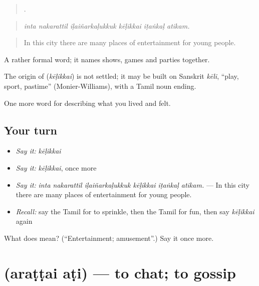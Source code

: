 \begin{quote}
     .
\end{quote}

\begin{quote}
\emph{inta nakarattil iḷaiñarkaḷukkuk kēḷikkai iṭaṅkaḷ atikam.}
\end{quote}

\begin{quote}
In this city there are many places of entertainment for young people.
\end{quote}

A rather formal word; it names shows, games and parties together.

\begin{cousinweb}
The origin of \textbf{} (\emph{kēḷikkai}) is not settled; it may be built on Sanskrit \emph{kēli}, \textquotedblleft{}play, sport, pastime\textquotedblright{} (Monier-Williams), with a Tamil noun ending.
\end{cousinweb}

\begin{grammarlens}[title={What you've built}]
One more word for describing what you lived and felt.
\end{grammarlens}

\subsection*{Your turn}
\begin{itemize}
\raggedright
  \item \emph{Say it:} \emph{kēḷikkai}
  \item \emph{Say it:} \emph{kēḷikkai}, once more
  \item \emph{Say it:} \emph{inta nakarattil iḷaiñarkaḷukkuk kēḷikkai iṭaṅkaḷ atikam.} — In this city there are many places of entertainment for young people.
  \item \emph{Recall:} say the Tamil for to sprinkle, then the Tamil for fun, then say \emph{kēḷikkai} again
\end{itemize}

\begin{tcolorbox}[breakable,colback=teal!4,colframe=teal!35!black,title={Before you move on}]
What does  mean? (\textquotedblleft{}Entertainment; amusement\textquotedblright{}.) Say it once more.
\end{tcolorbox}
\section[\texorpdfstring{\ta{அரட்டை} \ta{அடி} (araṭṭai aṭi)}{அரட்டை அடி (araṭṭai aṭi)}]{  (araṭṭai aṭi) — to chat; to gossip}

